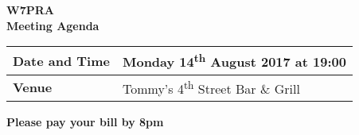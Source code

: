 \documentclass[letter,11pt]{extarticle}
\begin{document}
	\thispagestyle{empty}
	
	\begin{center}
		\textbf{W7PRA\\Meeting Agenda}
		\vspace{0.33cm}
	\end{center}
	
	\begin{center}
		\begin{tabular}{| m{3.0cm} | m{7.5cm} |} \hline
			\textbf{Date and Time} & Monday 14\textsuperscript{th} August 2017 at 19:00 \\ \hline
			\textbf{Venue} & Tommy's 4\textsuperscript{th} Street Bar \& Grill \\ \hline
				\end{tabular}
	\end{center}
	
	\begin{center}
		\textbf{Please pay your bill by 8pm}
	\end{center}
	
\end{document}
